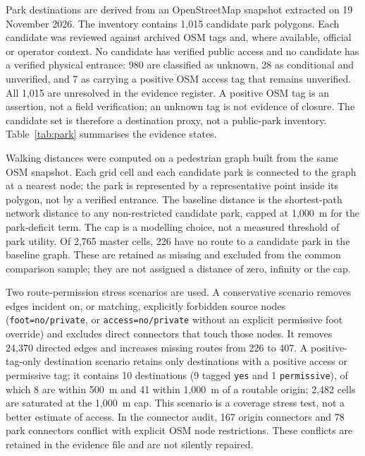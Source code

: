 \documentclass[times,twoside]{_Templates/MultiTargetManuscript}
\begin{document}
Park destinations are derived from an OpenStreetMap snapshot extracted on
19 November 2026. The inventory contains 1,015 candidate park polygons. Each
candidate was reviewed against archived OSM tags and, where available, official
or operator context. No candidate has verified public access and no candidate has
a verified physical entrance: 980 are classified as unknown, 28 as conditional
and unverified, and 7 as carrying a positive OSM access tag that remains
unverified. All 1,015 are unresolved in the evidence register. A positive OSM
tag is an assertion, not a field verification; an unknown tag is not evidence of
closure. The candidate set is therefore a destination proxy, not a public-park
inventory. Table~\ref{tab:park} summarises the evidence states.

Walking distances were computed on a pedestrian graph built from the same OSM
snapshot. Each grid cell and each candidate park is connected to the graph at a
nearest node; the park is represented by a representative point inside its
polygon, not by a verified entrance. The baseline distance is the shortest-path
network distance to any non-restricted candidate park, capped at 1,000~m for the
park-deficit term. The cap is a modelling choice, not a measured threshold of
park utility. Of 2,765 master cells, 226 have no route to a candidate park in
the baseline graph. These are retained as missing and excluded from the common
comparison sample; they are not assigned a distance of zero, infinity or the cap.

Two route-permission stress scenarios are used. A conservative scenario removes
edges incident on, or matching, explicitly forbidden source nodes
(\texttt{foot=no/private}, or \texttt{access=no/private} without an explicit
permissive foot override) and excludes direct connectors that touch those nodes.
It removes 24,370 directed edges and increases missing routes from 226 to 407.
A positive-tag-only destination scenario retains only destinations with a
positive access or permissive tag; it contains 10 destinations (9 tagged
\texttt{yes} and 1 \texttt{permissive}), of which 8 are within 500~m and 41
within 1,000~m of a routable origin; 2,482 cells are saturated at the 1,000~m
cap. This scenario is a coverage stress test, not a better estimate of access.
In the connector audit, 167 origin connectors and 78 park connectors conflict
with explicit OSM node restrictions. These conflicts are retained in the
evidence file and are not silently repaired.


\end{document}
